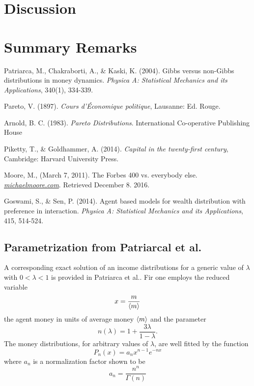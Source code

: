 \documentclass[10pt, a4paper]{amsart}
\begin{document}
\section{Discussion}

\section{Summary Remarks}


\begin{thebibliography}{10}

 Patriarca, M., Chakraborti, A., \& Kaski, K. (2004). 
	Gibbs versus non-Gibbs distributions in money dynamics. 
	\emph{Physica A: Statistical Mechanics and its Applications},
	340(1), 334-339.
	
 Pareto, V. (1897).
	\emph{Cours d'Économique politique},
	Lausanne: Ed. Rouge.

 Arnold, B. C. (1983). 
	\emph{Pareto Distributions}.
	 International Co-operative Publishing House	

 Piketty, T., \& Goldhammer, A. (2014).
	\emph{Capital in the twenty-first century},
	Cambridge: Harvard University Press.
	
 Moore, M., (March 7, 2011).
	The Forbes 400 vs. everybody else.
	\emph{\href{https://web.archive.org/web/20110309211959/http://www.michaelmoore.com/words/must-read/forbes-400-vs-everybody-else}{michaelmoore.com}}.
	Retrieved December 8. 2016.

 Goswami, S., \& Sen, P. (2014).
	Agent based models for wealth distribution with preference in interaction.
	\emph{Physica A: Statistical Mechanics and its Applications},
	415, 514-524.

\end{thebibliography}

\begin{appendices}

\section{Parametrization from Patriarcal et al.}
\label{app:partriarca}
A corresponding exact solution of an income distributions for a generic value of $\lambda$ with $0<\lambda<1$ is provided in Patriarca et al.\cite{Patriarca}. Fir one employs the reduced variable
\begin{equation}
x = \frac{m}{\ev{m}}
\end{equation}
the agent money in units of average money $\ev{m}$ and the parameter
\begin{equation}
n(\lambda) = 1 + \frac{3\lambda}{1-\lambda}.
\end{equation}
The money distributions, for arbitrary values of $\lambda$, are well fitted by the function
\begin{equation}
P_n(x) = a_nx^{n-1}e^{-nx}
\end{equation}
where $a_n$ is a normalization factor shown to be
\begin{equation}
a_n = \frac{n^n}{\Gamma(n)}
\end{equation}
\end{appendices}
\end{document}
